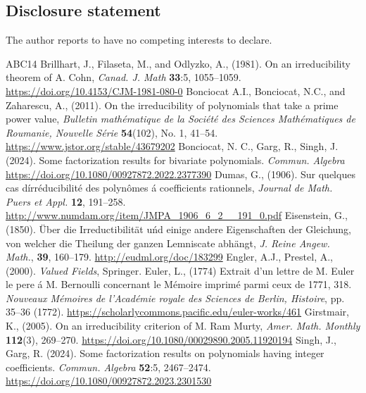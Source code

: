 \documentclass[12pt,reqno]{amsart}%
\begin{document}
\subsection*{Disclosure statement}
The author reports to have no competing interests to declare.
\begin{thebibliography}{ABC14}
 Brillhart, J.,  Filaseta, M., and Odlyzko, A., (1981). On an irreducibility theorem of A. Cohn,  \emph{Canad. J. Math} \textbf{33}:5, 1055--1059. \url{https://doi.org/10.4153/CJM-1981-080-0}
 Bonciocat A.I.,  Bonciocat, N.C., and Zaharescu, A., (2011). On the irreducibility of polynomials that take a prime power value, \emph{Bulletin math\'ematique de la Soci\'et\'e des Sciences Math\'ematiques de Roumanie, Nouvelle S\'erie} \textbf{54}(102), No. 1, 41--54. \url{https://www.jstor.org/stable/43679202}
Bonciocat, N. C., Garg, R., Singh, J. (2024). Some factorization results for bivariate polynomials. \emph{Commun. Algebra} \url{https://doi.org/10.1080/00927872.2022.2377390}
 Dumas, G., (1906). {{Sur quelques cas d\'{i}rr\'{e}ducibilit\'{e} des polyn\^{o}mes \'{a} coefficients rationnels}}, \emph{Journal de Math. Puers et Appl.} {\textbf{12}},  191--258. \url{http://www.numdam.org/item/JMPA_1906_6_2__191_0.pdf}
 Eisenstein, G., (1850). {{\"{U}ber die Irreductibilit\"{a}t u\'{n}d einige andere Eigenschaften der Gleichung, von welcher die Theilung der ganzen Lemniscate abh\"{a}ngt}}, \emph{J. Reine Angew. Math.}, {\textbf{39}}, 160--179. \url{http://eudml.org/doc/183299} %
 Engler, A.J., Prestel, A., (2000). \emph{Valued Fields},  Springer.
 Euler, L., (1774) Extrait d'un lettre de M. Euler le pere \'a M. Bernoulli concernant le M\'emoire imprim\'e
parmi ceux de 1771, 318. \emph{Nouveaux M\'emoires de l'Acad\'emie royale des Sciences de Berlin, Histoire}, pp. 35--36 (1772). \url{https://scholarlycommons.pacific.edu/euler-works/461}
 Girstmair, K., (2005). On an irreducibility criterion of M. Ram Murty,  \emph{Amer. Math. Monthly} {\bf{112}}(3), 269--270. \url{https://doi.org/10.1080/00029890.2005.11920194}
 Singh, J., Garg, R. (2024). Some factorization results on polynomials having integer coefficients. \emph{Commun. Algebra} \textbf{52}:5, 2467--2474. \url{https://doi.org/10.1080/00927872.2023.2301530}

\end{thebibliography}
\end{document}
